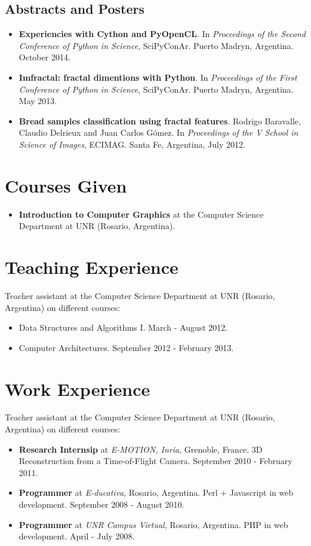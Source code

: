 \documentclass[a4paper,12pt]{article}
\begin{document}
\subsection*{Abstracts and Posters}
\begin{itemize}
\item {\bf Experiencies with Cython and PyOpenCL}. In {\it Proceedings of the Second Conference of Python in Science}, SciPyConAr. Puerto Madryn, Argentina. October 2014.
\item {\bf Imfractal: fractal dimentions with Python}.  In {\it Proceedings of the First Conference of Python in Science}, SciPyConAr. Puerto Madryn, Argentina. May 2013.
\item {\bf Bread samples classification using fractal features}. Rodrigo Baravalle, Claudio Delrieux and Juan Carlos G\'omez. In {\it Proceedings of the V School in Science of Images}, ECIMAG. Santa Fe, Argentina, July 2012.
\end{itemize}


\section*{Courses Given}
\begin{itemize}
\item {\bf Introduction to Computer Graphics} at the Computer Science Department at UNR (Rosario, Argentina).
\end{itemize}

\section*{Teaching Experience}

Teacher assistant at the Computer Science Department at UNR (Rosario, Argentina) on different courses:
\begin{itemize}
\item Data Structures and Algorithms I. March - August 2012.
\item Computer Architectures. September 2012 - February 2013.
\end{itemize}

\section*{Work Experience}

Teacher assistant at the Computer Science Department at UNR (Rosario, Argentina) on different courses:
\begin{itemize}
\item {\bf Research Internsip} at {\em E-MOTION, Inria}, Grenoble, France. 3D Reconstruction from a Time-of-Flight Camera. September 2010 - February 2011.
\item {\bf Programmer} at {\em E-ducativa}, Rosario, Argentina. Perl + Javascript in web development. September 2008 - August 2010.
\item {\bf Programmer} at {\em UNR Campus Virtual}, Rosario, Argentina. PHP in web development. April - July 2008.
\end{itemize}
\end{document}
